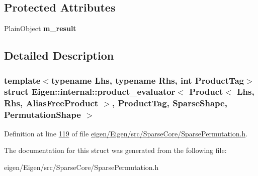 \subsection*{Protected Attributes}
\begin{DoxyCompactItemize}
\item 
\mbox{\label{struct_eigen_1_1internal_1_1product__evaluator_3_01_product_3_01_lhs_00_01_rhs_00_01_alias_free_9d3be1aa43ce7749965c0caa1184b53c_ae0121f10833313de9774ee2718e87b1c}} 
Plain\+Object {\bfseries m\+\_\+result}
\end{DoxyCompactItemize}


\subsection{Detailed Description}
\subsubsection*{template$<$typename Lhs, typename Rhs, int Product\+Tag$>$\newline
struct Eigen\+::internal\+::product\+\_\+evaluator$<$ Product$<$ Lhs, Rhs, Alias\+Free\+Product $>$, Product\+Tag, Sparse\+Shape, Permutation\+Shape $>$}



Definition at line \hyperlink{eigen_2_eigen_2src_2_sparse_core_2_sparse_permutation_8h_source_l00119}{119} of file \hyperlink{eigen_2_eigen_2src_2_sparse_core_2_sparse_permutation_8h_source}{eigen/\+Eigen/src/\+Sparse\+Core/\+Sparse\+Permutation.\+h}.



The documentation for this struct was generated from the following file\+:\begin{DoxyCompactItemize}
\item 
eigen/\+Eigen/src/\+Sparse\+Core/\+Sparse\+Permutation.\+h\end{DoxyCompactItemize}
